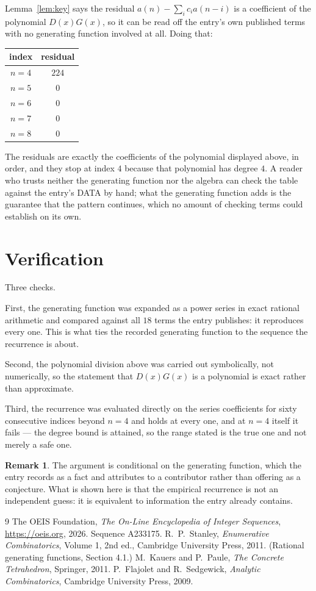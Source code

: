 \documentclass[11pt,a4paper]{article}
\theoremstyle{plain}
\theoremstyle{definition}
\newtheorem{remark}[theorem]{Remark}
\begin{document}
Lemma~\ref{lem:key} says the residual $a(n)-\sum_ic_ia(n-i)$ is a coefficient of the
polynomial $D(x)G(x)$, so it can be read off the entry's own published terms with no
generating function involved at all. Doing that:
\begin{center}
\begin{tabular}{cc}
index & residual \\ \hline
$n=4$ & $224$ \\
$n=5$ & $0$ \\
$n=6$ & $0$ \\
$n=7$ & $0$ \\
$n=8$ & $0$
\end{tabular}
\end{center}
The residuals are exactly the coefficients of the polynomial displayed above, in order, and
they stop at index $4$ because that polynomial has degree $4$. A reader who trusts
neither the generating function nor the algebra can check the table against the entry's DATA
by hand; what the generating function adds is the guarantee that the pattern continues, which
no amount of checking terms could establish on its own.

\section{Verification}

Three checks.

First, the generating function was expanded as a power series in exact rational arithmetic and
compared against all $18$ terms the entry publishes: it reproduces every one. This is
what ties the recorded generating function to the sequence the recurrence is about.

Second, the polynomial division above was carried out symbolically, not numerically, so the
statement that $D(x)G(x)$ is a polynomial is exact rather than approximate.

Third, the recurrence was evaluated directly on the series coefficients for sixty consecutive
indices beyond $n=4$ and holds at every one, and at $n=4$ itself it fails --- the
degree bound is attained, so the range stated is the true one and not merely a safe one.

\begin{remark}
The argument is conditional on the generating function, which the entry records as a fact and
attributes to a contributor rather than offering as a conjecture. What is shown here is that
the empirical recurrence is not an independent guess: it is equivalent to information the
entry already contains.
\end{remark}

\begin{thebibliography}{9}
 The OEIS Foundation, \emph{The On-Line Encyclopedia of Integer
Sequences}, \url{https://oeis.org}, 2026. Sequence A233175.
 R.~P.~Stanley, \emph{Enumerative Combinatorics}, Volume 1, 2nd ed.,
Cambridge University Press, 2011. (Rational generating functions, Section 4.1.)
 M.~Kauers and P.~Paule, \emph{The Concrete Tetrahedron}, Springer, 2011.
 P.~Flajolet and R.~Sedgewick, \emph{Analytic Combinatorics}, Cambridge
University Press, 2009.
\end{thebibliography}
\end{document}
